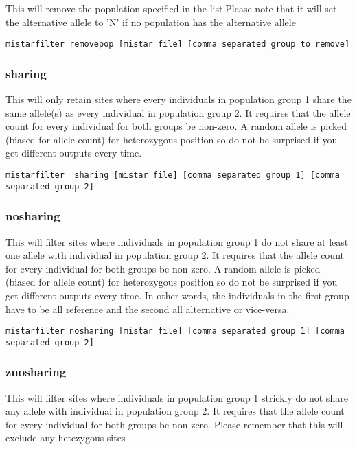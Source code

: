 \documentclass[a4paper]{article}
\begin{document}
This will remove the population specified in the list.Please note that it will set the alternative allele to 'N' if no population has the alternative allele

\begin{verbatim}
mistarfilter removepop [mistar file] [comma separated group to remove]
\end{verbatim}

\subsubsection{sharing}

This will only retain sites where every individuals in population group 1 share the same allele(s) as every individual in population group 2.
It requires that the allele count for every individual for both groups be non-zero.
A random allele is picked (biased for allele count) for heterozygous position so do not be surprised if you get different outputs every time.

\tiny
\begin{verbatim}
mistarfilter  sharing [mistar file] [comma separated group 1] [comma separated group 2]
\end{verbatim}
\normalsize

\subsubsection{nosharing}


This will filter sites where individuals in population group 1 do not share at least one allele with individual in population group 2.
It requires that the allele count for every individual for both groups be non-zero.
A random allele is picked (biased for allele count) for heterozygous position so do not be surprised if you get different outputs every time.
In other words, the individuals in the first group have to be all reference and the second all alternative or vice-versa.

\tiny
\begin{verbatim}
mistarfilter nosharing [mistar file] [comma separated group 1] [comma separated group 2]
\end{verbatim}
\normalsize

\subsubsection{znosharing}
This will filter sites where individuals in population group 1 strickly do not share any allele with individual in population group 2.
It requires that the allele count for every individual for both groups be non-zero.
Please remember that this will exclude any hetezygous sites
\end{document}
